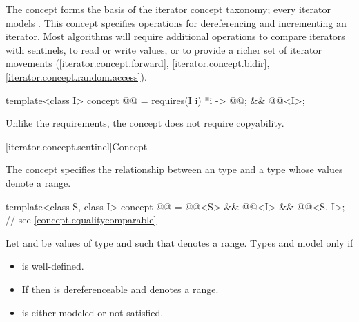 \pnum
The  concept forms the basis
of the iterator concept taxonomy; every iterator models .
This concept specifies operations for dereferencing and incrementing
an iterator. Most algorithms will require additional operations
to compare iterators with sentinels, to
read or write values, or
to provide a richer set of iterator movements (\ref{iterator.concept.forward},
\ref{iterator.concept.bidir}, \ref{iterator.concept.random.access}).

\begin{codeblock}
template<class I>
  concept @@ =
    requires(I i) {
      { *i } -> @@;
    } &&
    @@<I>;
\end{codeblock}

\pnum
\begin{note}
Unlike the  requirements,
the  concept does not require copyability.
\end{note}

[iterator.concept.sentinel]{Concept }

\pnum
The  concept specifies the relationship
between an  type and a  type
whose values denote a range.

\begin{itemdecl}
template<class S, class I>
  concept @@ =
    @@<S> &&
    @@<I> &&
    @@<S, I>;      // see \ref{concept.equalitycomparable}
\end{itemdecl}

\begin{itemdescr}
\pnum
Let  and  be values of type  and
 such that  denotes a range. Types
 and  model  only if
\begin{itemize}
\item {} is well-defined.

\item If  then  is dereferenceable and
       denotes a range.

\item {} is either modeled or not satisfied.
\end{itemize}
\end{itemdescr}

